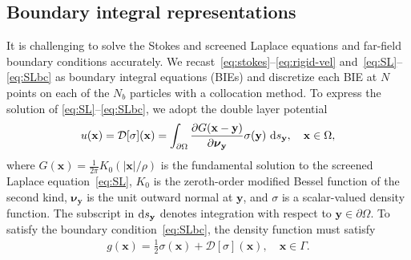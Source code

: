 \documentclass[prb,preprint,showpacs,preprintnumbers,amsmath,amssymb,longbibliography]{revtex4-1}
\newcommand{\DD}{\mathcal{D}}
\newcommand{\nnu}{\boldsymbol{\nu}}
\newcommand{\xx}{\mathbf{x}}
\newcommand{\yy}{\mathbf{y}}
\newcommand{\pderiv}[2]{\frac{\partial #1}{\partial #2}}
\begin{document}
\subsection{Boundary integral representations}
It is challenging to solve the Stokes and screened Laplace equations
and far-field boundary conditions accurately. 
We recast~\eqref{eq:stokes}--\eqref{eq:rigid-vel}
and~\eqref{eq:SL}--\eqref{eq:SLbc} as boundary integral equations (BIEs)
and discretize each BIE at $N$ points on each of the $N_b$ particles
with a collocation method. To express the solution of
\eqref{eq:SL}--\eqref{eq:SLbc}, we adopt the double layer potential
\begin{align}
\label{eq:SL_BIE}
u({\xx}) = \DD[\sigma](\xx) = \int_{\partial \Omega} 
  \pderiv{G(\xx-\yy)}{\nnu_\yy}\sigma(\yy)\, \dif s_\yy, 
  \quad \xx \in \Omega,
\end{align}
where $G(\xx) = \frac{1}{2\pi}K_0(|\xx|/\rho)$ is the fundamental
solution to the screened Laplace equation~\eqref{eq:SL}, $K_0$ is the
zeroth-order modified Bessel function of the second kind, $\nnu_\yy$ is
the unit outward normal at $\yy$, and $\sigma$ is a scalar-valued
density function. The subscript in $\dif s_\yy$ denotes integration with
respect to $\yy \in \partial \Omega$. To satisfy the boundary
condition~\eqref{eq:SLbc}, the density function must satisfy\cite{Hsiao2008}
\begin{align}
  \label{eq:SL_BIE2}
  g(\xx) = \frac{1}{2} \sigma(\xx) + \DD[\sigma](\xx), \quad
    \xx \in \Gamma.
\end{align}
\end{document}
